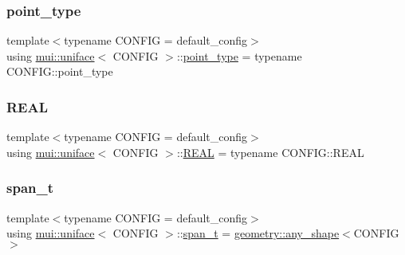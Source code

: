 \mbox{\label{classmui_1_1uniface_abc356ab801269c69e38dc07179f85ef9}} 
\subsubsection{\texorpdfstring{point\+\_\+type}{point\_type}}
{\footnotesize\ttfamily template$<$typename C\+O\+N\+F\+IG  = default\+\_\+config$>$ \\
using \hyperlink{classmui_1_1uniface}{mui\+::uniface}$<$ C\+O\+N\+F\+IG $>$\+::\hyperlink{classmui_1_1uniface_abc356ab801269c69e38dc07179f85ef9}{point\+\_\+type} =  typename C\+O\+N\+F\+I\+G\+::point\+\_\+type}

\mbox{\label{classmui_1_1uniface_a870dace227e6e5273505401ef33733ef}} 
\subsubsection{\texorpdfstring{R\+E\+AL}{REAL}}
{\footnotesize\ttfamily template$<$typename C\+O\+N\+F\+IG  = default\+\_\+config$>$ \\
using \hyperlink{classmui_1_1uniface}{mui\+::uniface}$<$ C\+O\+N\+F\+IG $>$\+::\hyperlink{classmui_1_1uniface_a870dace227e6e5273505401ef33733ef}{R\+E\+AL} =  typename C\+O\+N\+F\+I\+G\+::\+R\+E\+AL}

\mbox{\label{classmui_1_1uniface_a9aeea388b73b17bdc634eb1c96cbfeff}} 
\subsubsection{\texorpdfstring{span\+\_\+t}{span\_t}}
{\footnotesize\ttfamily template$<$typename C\+O\+N\+F\+IG  = default\+\_\+config$>$ \\
using \hyperlink{classmui_1_1uniface}{mui\+::uniface}$<$ C\+O\+N\+F\+IG $>$\+::\hyperlink{classmui_1_1uniface_a9aeea388b73b17bdc634eb1c96cbfeff}{span\+\_\+t} =  \hyperlink{classmui_1_1geometry_1_1any__shape}{geometry\+::any\+\_\+shape}$<$C\+O\+N\+F\+IG$>$}

